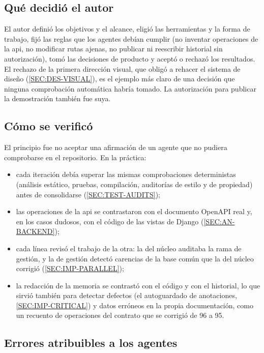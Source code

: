 \subsection{Qué decidió el autor}

El autor definió los objetivos y el alcance, eligió las herramientas y la forma de trabajo,
fijó las reglas que los agentes debían cumplir (no inventar operaciones de la \acs{api}, no
modificar rutas ajenas, no publicar ni reescribir historial sin autorización), tomó las
decisiones de producto y aceptó o rechazó los resultados. El rechazo de la primera dirección
visual, que obligó a rehacer el sistema de diseño (\cref{SEC:DES-VISUAL}), es el ejemplo más
claro de una decisión que ninguna comprobación automática habría tomado. La autorización
para publicar la demostración también fue suya.

\subsection{Cómo se verificó}

El principio fue no aceptar una afirmación de un agente que no pudiera comprobarse en el
repositorio. En la práctica:
\begin{itemize}
  \item cada iteración debía superar las mismas comprobaciones deterministas (análisis
        estático, pruebas, compilación, auditorías de estilo y de propiedad) antes de
        consolidarse (\cref{SEC:TEST-AUDITS});
  \item las operaciones de la \acs{api} se contrastaron con el documento OpenAPI real y, en
        los casos dudosos, con el código de las vistas de Django (\cref{SEC:AN-BACKEND});
  \item cada línea revisó el trabajo de la otra: la del núcleo auditaba la rama de gestión, y
        la de gestión detectó carencias de la base común que la del núcleo corrigió
        (\cref{SEC:IMP-PARALLEL});
  \item la redacción de la memoria se contrastó con el código y con el historial, lo que
        sirvió también para detectar defectos (el autoguardado de anotaciones,
        \cref{SEC:IMP-CRITICAL}) y datos erróneos en la propia documentación, como un
        recuento de operaciones del contrato que se corrigió de 96 a 95.
\end{itemize}

\subsection{Errores atribuibles a los agentes}

